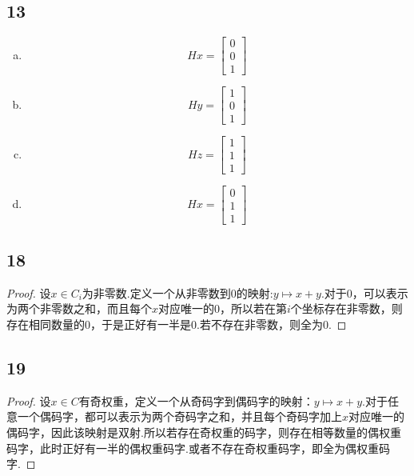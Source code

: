 \documentclass[twocolumn]{article}
\newenvironment{SChinese}{
	\CJKfamily{gbsn}
	\CJKtilde
	\CJKnospace}{}
\begin{document}
\begin{CJK}{UTF8}{}
\begin{SChinese}
			\subsection*{13}
				\begin{enumerate}[(a)]
					\item \begin{displaymath}
						Hx=\left[\begin{matrix}
						0 \\ 0 \\ 1
						\end{matrix}\right]
					\end{displaymath}
					\item \begin{displaymath}
					Hy=\left[\begin{matrix}
					1 \\ 0 \\ 1
					\end{matrix}\right]
					\end{displaymath}
					\item \begin{displaymath}
					Hz=\left[\begin{matrix}
					1 \\ 1 \\ 1
					\end{matrix}\right]
					\end{displaymath}
					\item \begin{displaymath}
					Hx=\left[\begin{matrix}
					0 \\ 1 \\ 1
					\end{matrix}\right]
					\end{displaymath} 
				\end{enumerate}
			\subsection*{18}
				\begin{proof}
					设$x\in C_i$为非零数.定义一个从非零数到0的映射:$y\mapsto x+y$.对于0，可以表示为两个非零数之和，而且每个$x$对应唯一的$0$，所以若在第$i$个坐标存在非零数，则存在相同数量的0，于是正好有一半是0.若不存在非零数，则全为0.
				\end{proof}
			\subsection*{19}
				\begin{proof}
					设$x\in C$有奇权重，定义一个从奇码字到偶码字的映射：$y\mapsto x+y$.对于任意一个偶码字，都可以表示为两个奇码字之和，并且每个奇码字加上$x$对应唯一的偶码字，因此该映射是双射.所以若存在奇权重的码字，则存在相等数量的偶权重码字，此时正好有一半的偶权重码字.或者不存在奇权重码字，即全为偶权重码字.
				\end{proof}

\end{SChinese}
\end{CJK}
\end{document}
